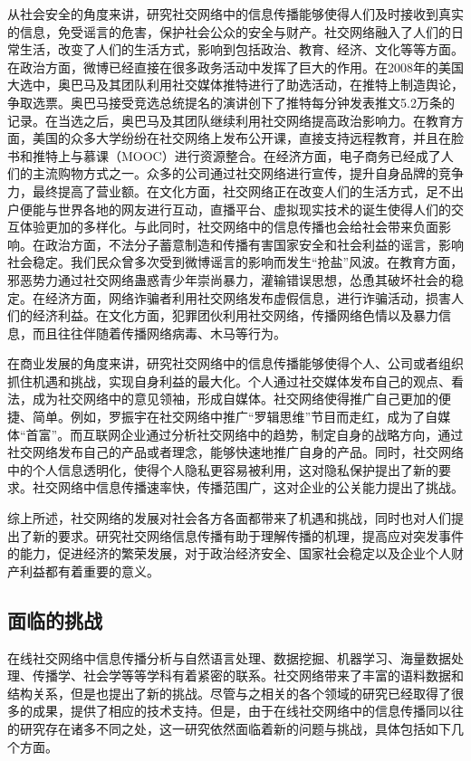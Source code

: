 从社会安全的角度来讲，研究社交网络中的信息传播能够使得人们及时接收到真实的信息，免受谣言的危害，保护社会公众的安全与财产。社交网络融入了人们的日常生活，改变了人们的生活方式，影响到包括政治、教育、经济、文化等等方面。在政治方面，微博已经直接在很多政务活动中发挥了巨大的作用。在2008年的美国大选中，奥巴马及其团队利用社交媒体推特进行了助选活动，在推特上制造舆论，争取选票。奥巴马接受竞选总统提名的演讲创下了推特每分钟发表推文5.2万条的记录。在当选之后，奥巴马及其团队继续利用社交网络提高政治影响力。在教育方面，美国的众多大学纷纷在社交网络上发布公开课，直接支持远程教育，并且在脸书和推特上与慕课（MOOC）进行资源整合。在经济方面，电子商务已经成了人们的主流购物方式之一。众多的公司通过社交网络进行宣传，提升自身品牌的竞争力，最终提高了营业额。在文化方面，社交网络正在改变人们的生活方式，足不出户便能与世界各地的网友进行互动，直播平台、虚拟现实技术的诞生使得人们的交互体验更加的多样化。与此同时，社交网络中的信息传播也会给社会带来负面影响。在政治方面，不法分子蓄意制造和传播有害国家安全和社会利益的谣言，影响社会稳定。我们民众曾多次受到微博谣言的影响而发生“抢盐”风波。在教育方面，邪恶势力通过社交网络蛊惑青少年崇尚暴力，灌输错误思想，怂恿其破坏社会的稳定。在经济方面，网络诈骗者利用社交网络发布虚假信息，进行诈骗活动，损害人们的经济利益。在文化方面，犯罪团伙利用社交网络，传播网络色情以及暴力信息，而且往往伴随着传播网络病毒、木马等行为。

在商业发展的角度来讲，研究社交网络中的信息传播能够使得个人、公司或者组织抓住机遇和挑战，实现自身利益的最大化。个人通过社交媒体发布自己的观点、看法，成为社交网络中的意见领袖，形成自媒体。社交网络使得推广自己更加的便捷、简单。例如，罗振宇在社交网络中推广“罗辑思维”节目而走红，成为了自媒体“首富”。而互联网企业通过分析社交网络中的趋势，制定自身的战略方向，通过社交网络发布自己的产品或者理念，能够快速地推广自身的产品。同时，社交网络中的个人信息透明化，使得个人隐私更容易被利用，这对隐私保护提出了新的要求。社交网络中信息传播速率快，传播范围广，这对企业的公关能力提出了挑战。

综上所述，社交网络的发展对社会各方各面都带来了机遇和挑战，同时也对人们提出了新的要求。研究社交网络信息传播有助于理解传播的机理，提高应对突发事件的能力，促进经济的繁荣发展，对于政治经济安全、国家社会稳定以及企业个人财产利益都有着重要的意义。
\subsection{面临的挑战}
\label{subsec1:challenge}
在线社交网络中信息传播分析与自然语言处理、数据挖掘、机器学习、海量数据处理、传播学、社会学等等学科有着紧密的联系。社交网络带来了丰富的语料数据和结构关系，但是也提出了新的挑战。尽管与之相关的各个领域的研究已经取得了很多的成果，提供了相应的技术支持。但是，由于在线社交网络中的信息传播同以往的研究存在诸多不同之处，这一研究依然面临着新的问题与挑战，具体包括如下几个方面。

